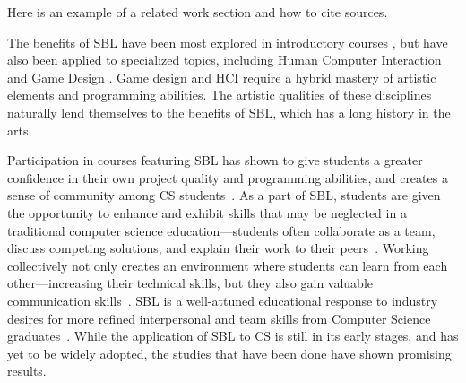 Here is an example of a related work section and how to cite sources.

The benefits of SBL have been most explored in introductory
courses \cite{p55-gestwicki, p505-hendrix, p165-narayanan}, but have
also been applied to specialized topics, including Human Computer
Interaction \cite{p117-hundhausen} and Game Design
\cite{p64-estey}. Game design and HCI require a hybrid mastery of
artistic elements and programming abilities. The artistic qualities of
these disciplines naturally lend themselves to the benefits of SBL,
which has a long history in the arts.

Participation in courses featuring SBL has shown to give students a
greater confidence in their own project quality and programming
abilities, and creates a sense of community among CS
students~\cite{p887-bergin, p64-estey}. As a part of SBL, students are
given the opportunity to enhance and exhibit skills that may be
neglected in a traditional computer science education---students often
collaborate as a team, discuss competing solutions, and explain their
work to their peers~\cite{p505-hendrix}.  Working collectively not
only creates an environment where students can learn from each
other---increasing their technical skills, but they also gain valuable
communication skills~\cite{p165-narayanan}. SBL is a well-attuned
educational response to industry desires for more refined
interpersonal and team skills from Computer Science
graduates~\cite{p64-estey}.  While the application of SBL to CS is
still in its early stages, and has yet to be widely adopted, the
studies that have been done have shown promising results.

